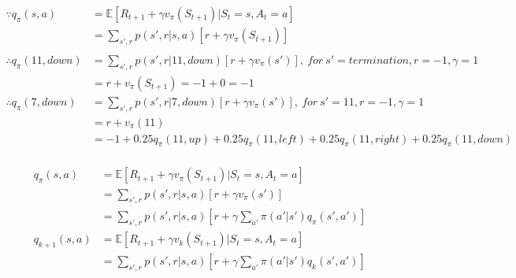 \documentclass{article}
\begin{document}
\[
  \begin{aligned}
    \because q_{\pi}(s,a) &= \mathbb{E}[R_{t+1} + \gamma v_{\pi}(S_{t+1}) | S_{t}=s, A_{t}=a]\\
    &= \sum_{s',r}p(s',r|s,a)[r + \gamma v_{\pi}(S_{t+1})]\\
    \\
    \therefore q_{\pi}(11,down) &= \sum_{s',r}p(s',r|11,down)[r + \gamma v_{\pi}(s')], \  for \  s'=termination, r=-1, \gamma = 1\\
    &= r + v_{\pi}(S_{t+1}) = -1 + 0 = -1 \\
    \therefore q_{\pi}(7,down) &= \sum_{s',r}p(s',r|7,down)[r + \gamma v_{\pi}(s')], \  for \  s'=11, r=-1, \gamma = 1\\
    &= r + v_{\pi}(11) \\
    &= -1 + 0.25q_{\pi}(11,up) + 0.25q_{\pi}(11,left) + 0.25q_{\pi}(11,right) + 0.25q_{\pi}(11,down)\\
  \end{aligned}
\]

\[
  \begin{aligned}
    q_{\pi}(s,a) &= \mathbb{E}[R_{t+1} + \gamma v_{\pi}(S_{t+1}) | S_{t}=s, A_{t}=a]\\
    &= \sum_{s',r}p(s',r|s,a)[r + \gamma v_{\pi}(s')]\\
    &= \sum_{s',r}p(s',r|s,a)[r + \gamma \sum_{a'}\pi(a'|s')q_{\pi}(s',a')]\\
    q_{k+1}(s, a) &= \mathbb{E}[R_{t+1} + \gamma v_{k}(S_{t+1}) | S_{t}=s, A_{t}=a]\\
    &= \sum_{s',r}p(s',r|s,a)[r + \gamma \sum_{a'}\pi(a'|s')q_{k}(s',a')]
  \end{aligned}
\]
\end{document}
